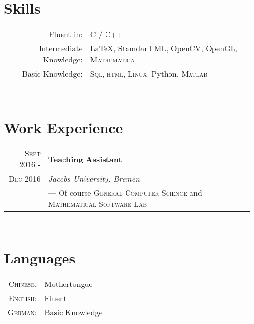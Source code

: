 \documentclass[a4paper,10pt]{article}
\begin{document}
	~\\
	
	\section{Skills}
	\begin{tabular}{rl}
		Fluent in: & \textsc{C / C++}\\
		Intermediate Knowledge:& {\fb \LaTeX}, Stamdard ML, OpenCV, OpenGL, \textsc{Mathematica}\\
		Basic Knowledge:& \textsc{Sql}, \textsc{html}, \textsc{Linux}, Python,  \textsc{Matlab}\\
	\end{tabular}
	
	
	~\\
	
	\section{Work Experience}
	\begin{tabular}{r|l}
		\textsc{Sept 2016 - } & \textbf{Teaching Assistant} \\\textsc{Dec 2016}&\emph{Jacobs University, Bremen}
		\\& --- Of course \textsc{General Computer Science} and \textsc{Mathematical Software Lab}
	\end{tabular}
	
	~\\
	
	\section{Languages}
	\begin{tabular}{rl}
		\textsc{Chinese:}&Mothertongue\\
		\textsc{English:}&Fluent\\
		\textsc{German:}&Basic Knowledge\\
	\end{tabular}
	
\end{document}
